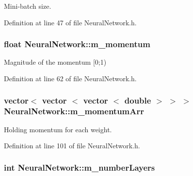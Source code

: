 Mini-\/batch size. 



Definition at line 47 of file Neural\+Network.\+h.

\subsubsection[{\texorpdfstring{m\+\_\+momentum}{m_momentum}}]{\setlength{\rightskip}{0pt plus 5cm}float Neural\+Network\+::m\+\_\+momentum\hspace{0.3cm}{\ttfamily [protected]}}\hypertarget{classNeuralNetwork_a8940dc6859b38907717cfec54e0929b1}{}\label{classNeuralNetwork_a8940dc6859b38907717cfec54e0929b1}


Magnitude of the momentum \mbox{[}0;1) 



Definition at line 62 of file Neural\+Network.\+h.

\subsubsection[{\texorpdfstring{m\+\_\+momentum\+Arr}{m_momentumArr}}]{\setlength{\rightskip}{0pt plus 5cm}vector$<$ vector $<$ vector $<$ double $>$ $>$ $>$ Neural\+Network\+::m\+\_\+momentum\+Arr\hspace{0.3cm}{\ttfamily [protected]}}\hypertarget{classNeuralNetwork_a4345c084a3e1f604a3757e3b1ae3ad54}{}\label{classNeuralNetwork_a4345c084a3e1f604a3757e3b1ae3ad54}


Holding momentum for each weight. 



Definition at line 101 of file Neural\+Network.\+h.

\subsubsection[{\texorpdfstring{m\+\_\+number\+Layers}{m_numberLayers}}]{\setlength{\rightskip}{0pt plus 5cm}int Neural\+Network\+::m\+\_\+number\+Layers\hspace{0.3cm}{\ttfamily [protected]}}\hypertarget{classNeuralNetwork_a1efaefc2c42a3d309c0b5e4a80a55f52}{}\label{classNeuralNetwork_a1efaefc2c42a3d309c0b5e4a80a55f52}



